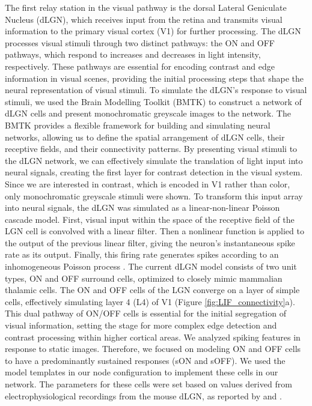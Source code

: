 \documentclass[12pt]{article}
\begin{document}
The first relay station in the visual pathway is the dorsal Lateral Geniculate Nucleus (dLGN), which receives input from the retina and transmits visual information to the primary visual cortex (V1) for further processing. The dLGN processes visual stimuli through two distinct pathways: the ON and OFF pathways, which respond to increases and decreases in light intensity, respectively. These pathways are essential for encoding contrast and edge information in visual scenes, providing the initial processing steps that shape the neural representation of visual stimuli. To simulate the dLGN's response to visual stimuli, we used the Brain Modelling Toolkit (BMTK) to construct a network of dLGN cells and present monochromatic greyscale images to the network. The BMTK provides a flexible framework for building and simulating neural networks, allowing us to define the spatial arrangement of dLGN cells, their receptive fields, and their connectivity patterns. By presenting visual stimuli to the dLGN network, we can effectively simulate the translation of light input into neural signals, creating the first layer for contrast detection in the visual system. Since we are interested in contrast, which is encoded in V1 rather than color, only monochromatic greyscale stimuli were shown. To transform this input array into neural signals, the dLGN was simulated as a linear-non-linear Poisson cascade model. First, visual input within the space of the receptive field of the LGN cell is convolved with a linear filter. Then a nonlinear function is applied to the output of the previous linear filter, giving the neuron's instantaneous spike rate as its output. Finally, this firing rate generates spikes according to an inhomogeneous Poisson process \autocite{moskovitzComparisonDeepLearning2018}. The current dLGN model consists of two unit types, ON and OFF surround cells, optimized to closely mimic mammalian thalamic cells. The ON and OFF cells of the LGN converge on a layer of simple cells, effectively simulating layer 4 (L4) of V1 (Figure \ref{fig:LIF_connectivity}a). This dual pathway of ON/OFF cells is essential for the initial segregation of visual information, setting the stage for more complex edge detection and contrast processing within higher cortical areas. We analyzed spiking features in response to static images. Therefore, we focused on modeling ON and OFF cells to have a predominantly sustained responses (sON and sOFF). We used the model templates in our node configuration to implement these cells in our network. The parameters for these cells were set based on values derived from electrophysiological recordings from the mouse dLGN, as reported by \textcite{durandComparisonVisualResponse2016} and \textcite{billehSystematicIntegrationStructural2020}.
\end{document}

